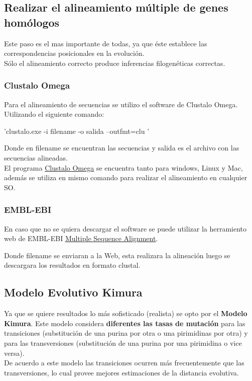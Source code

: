 \documentclass[a4paper]{article}
\begin{document}
\subsection{Realizar el alineamiento múltiple de genes homólogos}
Este paso es el mas importante de todas, ya que éste establece las correspondencias posicionales en la evolución.\\
Sólo el alineamiento correcto produce inferencias filogenéticas
correctas.
\subsubsection*{Clustalo Omega}
Para el alineamiento de secuencias se utilizo el software de Clustalo Omega.
Utilizando el siguiente comando:
\begin{center}
	'clustalo.exe -i filename -o salida --outfmt=clu '
\end{center}
Donde en filename se encuentran las secuencias y salida es el archivo con las secuencias alineadas.\\


\noindent El programa \href{http://www.clustal.org/omega/}{Clustalo Omega} se encuentra tanto para windows, Linux y Mac, además se utiliza en mismo comando para realizar el alineamiento en cualquier SO.

\subsubsection*{EMBL-EBI}
En caso que no se quiera descargar el software se puede utilizar la herramiento web de EMBL-EBI \href{https://www.ebi.ac.uk/Tools/msa/muscle/}{\underline{Multiple Sequence Alignment}}.

\noindent Donde filename se enviaran a la Web, esta realizara la alineación luego se descargara los resultados en formato clustal.\\

\subsection{Modelo Evolutivo Kimura}
Ya que se quiere resultados lo más sofisticado (realista) se opto por el \textbf{Modelo Kimura}.
Este modelo considera \textbf{diferentes las tasas de mutación} para las transiciones (substitución de una purina por otra o una pirimidinas por otra) y para las transversiones (substitución de una purina por una pirimidina o vice versa).\\

De acuerdo a este modelo las transiciones ocurren más frecuentemente que las transversiones, lo cual provee mejores estimaciones de la distancia evolutiva.
\end{document}
